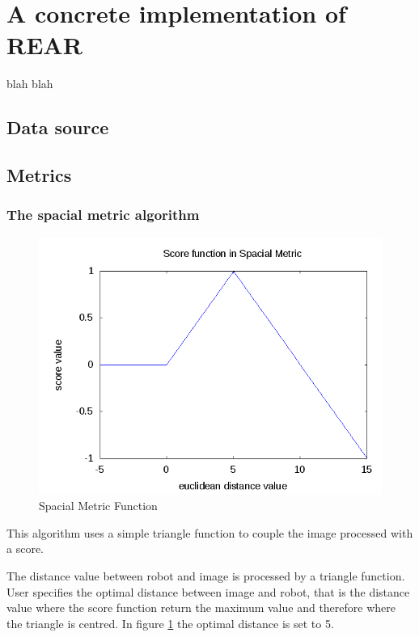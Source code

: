 \section{A concrete implementation of REAR}
\label{sec:concr}

blah blah

\subsection{Data source}

\subsection{Metrics}

\subsubsection{The spacial metric algorithm}
\label{subsec:spacial_metric_algorithm}

\begin{figure}[!h]
  \begin{center}
    \includegraphics[width=400pt]{img/spacialMetricFunc.png} 
    \caption{Spacial Metric Function}
    \label{fig:spacial_metric_func}
  \end{center}
\end{figure}

This algorithm uses a simple triangle function to couple the image processed with a score.
%

%
The distance value between robot and image is processed by a triangle function. User specifies
the optimal distance between image and robot, that is the distance value where
the score function return the maximum value and therefore where the triangle is centred.
In figure \ref{fig:spacial_metric_func} the optimal distance is set to 5.
%

